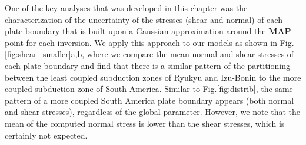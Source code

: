 \documentclass[12pt]{article}
\begin{document}
One of the key analyses that was developed in this chapter was the characterization of the uncertainty of the stresses (shear and normal) of each plate boundary that is built upon a Gaussian approximation around the \textbf{MAP} point for each inversion. We apply this approach to our models as shown in Fig.\ref{fig:shear_smaller}a,b, where we compare the mean normal and shear stresses of each plate boundary and find that there is a similar pattern of the partitioning between the least coupled subduction zones of Ryukyu and Izu-Bonin to the more coupled subduction zone of South America. Similar to Fig.\ref{fig:distrib}, the same pattern of a more coupled South America plate boundary appears (both normal and shear stresses), regardless of the global parameter. However, we note that the mean of the computed normal stress is lower than the shear stresses, which is certainly not expected.
\end{document}
